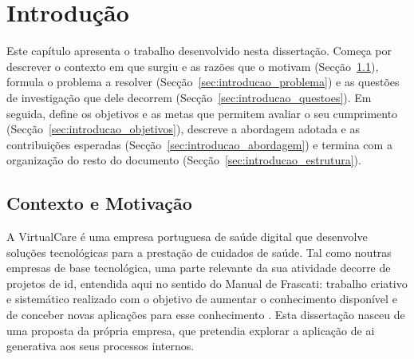 \chapter{Introdução}
\label{chap:introducao}


Este capítulo apresenta o trabalho desenvolvido nesta dissertação. Começa por descrever o contexto em que surgiu e as razões que o motivam (Secção~\ref{sec:introducao_contexto}), formula o problema a resolver (Secção~\ref{sec:introducao_problema}) e as questões de investigação que dele decorrem (Secção~\ref{sec:introducao_questoes}). Em seguida, define os objetivos e as metas que permitem avaliar o seu cumprimento (Secção~\ref{sec:introducao_objetivos}), descreve a abordagem adotada e as contribuições esperadas (Secção~\ref{sec:introducao_abordagem}) e termina com a organização do resto do documento (Secção~\ref{sec:introducao_estrutura}).

\section{Contexto e Motivação}
\label{sec:introducao_contexto}

A VirtualCare é uma empresa portuguesa de saúde digital que desenvolve soluções tecnológicas para a prestação de cuidados de saúde. Tal como noutras empresas de base tecnológica, uma parte relevante da sua atividade decorre de projetos de \gls{id}, entendida aqui no sentido do Manual de Frascati: trabalho criativo e sistemático realizado com o objetivo de aumentar o conhecimento disponível e de conceber novas aplicações para esse conhecimento \parencite{oecd2015frascati}. Esta dissertação nasceu de uma proposta da própria empresa, que pretendia explorar a aplicação de \gls{ai} generativa aos seus processos internos.

